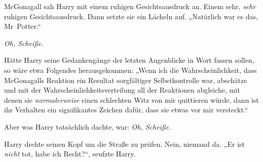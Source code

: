 McGonagall sah Harry mit einem ruhigen Gesichtsausdruck an. Einem sehr, \emph{sehr} ruhigen Gesichtsausdruck. Dann setzte sie ein Lächeln auf. „Natürlich war es das, Mr~Potter.“

\emph{Oh, Scheiße.}

Hätte Harry seine Gedankengänge der letzten Augenblicke in Wort fassen sollen, so wäre etwa Folgendes herausgekommen: „Wenn ich die Wahrscheinlichkeit, dass McGonagalls Reaktion ein Resultat sorgfältiger Selbstkontrolle war, abschätze und mit der Wahrscheinlichkeitsverteilung all der Reaktionen abgleiche, mit denen sie \emph{normalerweise} einen schlechten Witz von mir quittieren würde, dann ist ihr Verhalten ein signifikantes Zeichen dafür, dass sie etwas vor mir versteckt.“

Aber was Harry tatsächlich dachte, war: \emph{Oh, Scheiße.}

Harry drehte seinen Kopf um die Straße zu prüfen. Nein, niemand da. „Er ist \emph{nicht} tot, habe ich Recht?“, seufzte Harry.

